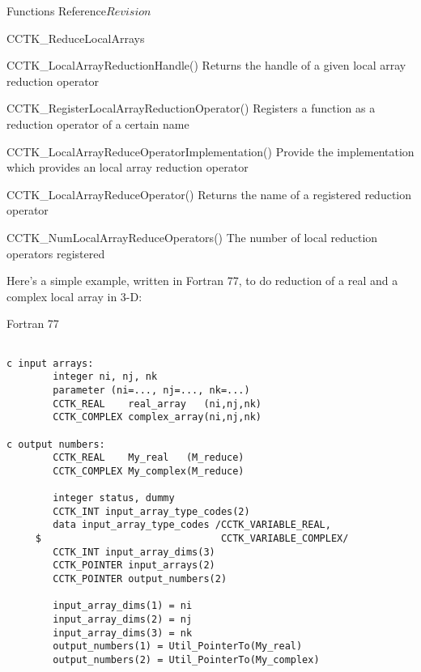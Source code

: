 \begin{cactuspart}{ Functions Reference}{}{$Revision$}
\begin{FunctionDescription}{CCTK\_ReduceLocalArrays}
\begin{SeeAlsoSection}
\begin{SeeAlso}{CCTK\_LocalArrayReductionHandle()}
Returns the handle of a given local array reduction operator
\end{SeeAlso}

\begin{SeeAlso}{CCTK\_RegisterLocalArrayReductionOperator()}
Registers a function as a reduction operator of a certain name
\end{SeeAlso}

\begin{SeeAlso}{CCTK\_LocalArrayReduceOperatorImplementation()}
Provide the implementation which provides an local array reduction operator
\end{SeeAlso}

\begin{SeeAlso}{CCTK\_LocalArrayReduceOperator()}
Returns the name of a registered reduction operator
\end{SeeAlso}

\begin{SeeAlso}{CCTK\_NumLocalArrayReduceOperators()}
The number of local reduction operators registered
\end{SeeAlso}
\end{SeeAlsoSection}

\begin{ExampleSection}
\begin{ExampleDescription}
Here's a simple example, written in Fortran 77, to do reduction
of a real and a complex local array in 3-D:
\end{ExampleDescription}
\begin{Example}{Fortran 77}
\begin{verbatim}

c input arrays:
        integer ni, nj, nk
        parameter (ni=..., nj=..., nk=...)
        CCTK_REAL    real_array   (ni,nj,nk)
        CCTK_COMPLEX complex_array(ni,nj,nk)

c output numbers:
        CCTK_REAL    My_real   (M_reduce)
        CCTK_COMPLEX My_complex(M_reduce)

        integer status, dummy
        CCTK_INT input_array_type_codes(2)
        data input_array_type_codes /CCTK_VARIABLE_REAL,
     $                               CCTK_VARIABLE_COMPLEX/
        CCTK_INT input_array_dims(3)
        CCTK_POINTER input_arrays(2)
        CCTK_POINTER output_numbers(2)

        input_array_dims(1) = ni
        input_array_dims(2) = nj
        input_array_dims(3) = nk
        output_numbers(1) = Util_PointerTo(My_real)
        output_numbers(2) = Util_PointerTo(My_complex)


\end{verbatim}
\end{Example}
\end{ExampleSection}
\end{FunctionDescription}
\end{cactuspart}
